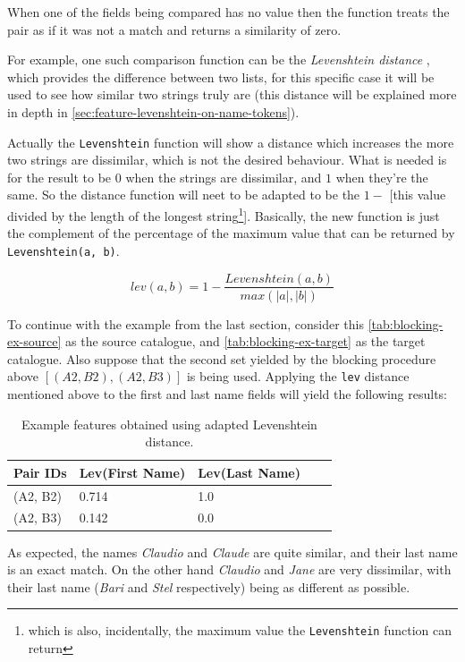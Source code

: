 \documentclass[epsfig,a4paper,11pt,titlepage,twoside,openany]{book}
\begin{document}
When one of the fields being compared has no value then the function treats the
pair as if it was not a match and returns a similarity of zero.

For example, one such comparison function can be the \textit{Levenshtein distance} \cite{levenshtein1966binary}, which provides the difference between two lists, for this specific case it will be used to see how similar two strings truly are (this distance will be explained more in depth in \autoref{sec:feature-levenshtein-on-name-tokens}). 

Actually the \texttt{Levenshtein} function will show a distance which increases the more two strings are dissimilar, which is not the desired behaviour. What is needed is for the result to be $0$ when the strings are dissimilar, and $1$ when they're the same. So the distance function will neet to be adapted to be the $1 -$ [this value divided by the length of the longest string\footnote{which is also, incidentally, the maximum value the \texttt{Levenshtein} function can return}]. Basically, the new function is just the complement of the percentage of the maximum value that can be returned by \texttt{Levenshtein(a, b)}.

$$
lev(a,b) = 1 - \frac{Levenshtein(a, b)}{max(|a|, |b|)}
$$

To continue with the example from the last section, consider this \autoref{tab:blocking-ex-source} as the source catalogue, and \autoref{tab:blocking-ex-target} as the target catalogue. Also suppose that the second
set yielded by the blocking procedure above $[(A2, B2), (A2, B3)]$ is being used. Applying the
\texttt{lev} distance mentioned above to the first and last name fields will
yield the following results:

\begin{table}[H]
  \centering
  \begin{tabular}{l|l|l|l|l}
    Pair IDs & Lev(First Name) & Lev(Last Name) \\ \hline
    (A2, B2) & 0.714           & 1.0            \\
    (A2, B3) & 0.142           & 0.0           
  \end{tabular}
  \caption{Example features obtained using adapted Levenshtein distance.}
  \label{tab:ex-feature-levens}
\end{table}

As expected, the names \textit{Claudio} and \textit{Claude} are quite similar,
and their last name is an exact match. On the other hand \textit{Claudio} and
\textit{Jane} are very dissimilar, with their last name (\textit{Bari} and
\textit{Stel} respectively) being as different as possible.
\end{document}
